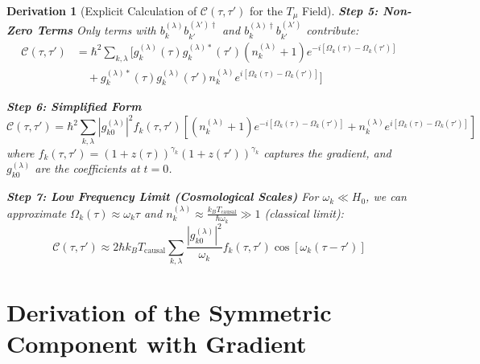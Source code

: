 \documentclass[10pt, a4paper]{article}
\newtheorem{derivation}{Derivation}
\begin{document}
\begin{derivation}[Explicit Calculation of $\mathcal{C}(\tau, \tau')$ for the $T_\mu$ Field]
\textbf{Step 5: Non-Zero Terms}
Only terms with $b_{k}^{(\lambda)} b_{k'}^{(\lambda')\dagger}$ and $b_{k}^{(\lambda)\dagger} b_{k'}^{(\lambda')}$ contribute:
\begin{align}
\mathcal{C}(\tau, \tau') &= \hbar^2 \sum_{k,\lambda} \big[ g_{k}^{(\lambda)}(\tau) g_{k}^{(\lambda)*}(\tau') (n_k^{(\lambda)} + 1) e^{-i[\Omega_k(\tau)-\Omega_k(\tau')]} \\
&\quad + g_{k}^{(\lambda)*}(\tau) g_{k}^{(\lambda)}(\tau') n_k^{(\lambda)} e^{i[\Omega_k(\tau)-\Omega_k(\tau')]} \big]
\tag{15.9}
\end{align}

\textbf{Step 6: Simplified Form}
\begin{equation}
\mathcal{C}(\tau, \tau') = \hbar^2 \sum_{k,\lambda} |g_{k0}^{(\lambda)}|^2 f_k(\tau, \tau') \left[ (n_k^{(\lambda)} + 1) e^{-i[\Omega_k(\tau)-\Omega_k(\tau')]} + n_k^{(\lambda)} e^{i[\Omega_k(\tau)-\Omega_k(\tau')]} \right]
\tag{15.10}
\end{equation}
where $f_k(\tau, \tau') = (1+z(\tau))^{\gamma_k} (1+z(\tau'))^{\gamma_k}$ captures the gradient, and $g_{k0}^{(\lambda)}$ are the coefficients at $t=0$.

\textbf{Step 7: Low Frequency Limit (Cosmological Scales)}
For $\omega_k \ll H_0$, we can approximate $\Omega_k(\tau) \approx \omega_k \tau$ and $n_k^{(\lambda)} \approx \frac{k_B T_{\text{causal}}}{\hbar\omega_k} \gg 1$ (classical limit):
\begin{equation}
\mathcal{C}(\tau, \tau') \approx 2\hbar k_B T_{\text{causal}} \sum_{k,\lambda} \frac{|g_{k0}^{(\lambda)}|^2}{\omega_k} f_k(\tau, \tau') \cos[\omega_k (\tau - \tau')]
\tag{15.11}
\end{equation}
\end{derivation}

\section{Derivation of the Symmetric Component with Gradient}
\end{document}
